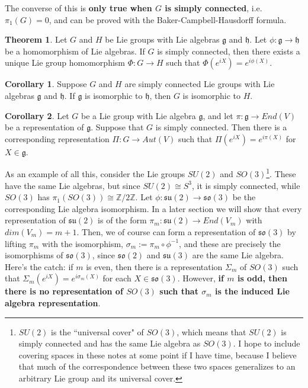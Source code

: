 \documentclass[11pt, oneside]{article}   	%
\theoremstyle{definition}
\newtheorem{theorem}{Theorem}[section]
\newtheorem{corollary}{Corollary}[theorem]
\begin{document}
The converse of this is \textbf{only true when $G$ is simply connected}, i.e. $\pi_1(G) = 0$, and can be proved with 
the Baker-Campbell-Hausdorff formula. 
\begin{theorem}
	Let $G$ and $H$ be Lie groups with Lie algebras $\mathfrak g$ and $\mathfrak h$. Let $\phi : \mathfrak g
	\rightarrow\mathfrak h$ be a homomorphism of Lie algebras. If $G$ is simply connected, then there exists 
	a unique Lie group homomorphism $\Phi : G\rightarrow H$ such that $\Phi(e^{iX}) = e^{i\phi(X)}$. 
\end{theorem}
\begin{corollary}
	Suppose $G$ and $H$ are simply connected Lie groups with Lie algebras $\mathfrak g$ and $\mathfrak h$. If 
	$\mathfrak g$ is isomorphic to $\mathfrak h$, then $G$ is isomorphic to $H$. 
\end{corollary}
\begin{corollary}
	Let $G$ be a Lie group with Lie algebra $\mathfrak g$, and let $\pi : \mathfrak g\rightarrow End(V)$ be a representation 
	of $\mathfrak g$. Suppose that $G$ is simply connected. Then there is a corresponding representation $\Pi : 
	G\rightarrow Aut(V)$ such that $\Pi(e^{iX}) = e^{i\pi(X)}$ for $X\in\mathfrak g$. 
\end{corollary}

As an example of all this, consider the Lie groups $SU(2)$ and $SO(3)$\footnote{$SU(2)$ is the ``universal cover" of $SO(3)$, 
which means that $SU(2)$ is simply connected and has the same Lie algebra as $SO(3)$. I hope to include covering spaces in 
these notes at some point if I have time, because I believe that much of the correspondence between these two spaces 
generalizes to an arbitrary Lie group and its universal cover.}. These have the same Lie algebras, 
but since $SU(2)\cong S^3$, it is simply connected, while $SO(3)$ has $\pi_1(SO(3))\cong\mathbb Z / 2\mathbb Z$. 
Let $\phi : \mathfrak{su}(2)\rightarrow\mathfrak{so}(3)$ be the corresponding Lie algebra isomorphism. 
In a later section we will show that every representation of $\mathfrak{su}(2)$ is of the form $\pi_m : \mathfrak{su}(2)
\rightarrow End(V_m)$ with $dim(V_m) = m + 1$. Then, we of course can form a representation of $\mathfrak{so}(3)$ 
by lifting $\pi_m$ with the isomorphism, $\sigma_m := \pi_m\circ\phi^{-1}$, and these are precisely the isomorphisms 
of $\mathfrak{so}(3)$, since $\mathfrak{so}(2)$ and $\mathfrak{su}(3)$ are the same Lie algebra. Here's the catch: 
if $m$ is even, then there is a representation $\Sigma_m$ of $SO(3)$ such that $\Sigma_m(e^{iX}) = e^{i\sigma_m(X)}$ 
for each $X\in\mathfrak{so}(3)$. However, \textbf{if $m$ is odd, then there is no representation of $SO(3)$ such that 
$\sigma_m$ is the induced Lie algebra representation}. 
\end{document}
